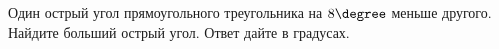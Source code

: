 \begin{ex}
	\begin{condition}
		Один острый угол прямоугольного треугольника на \( 8\degree \) меньше другого. Найдите больший острый угол. Ответ дайте в градусах.
	\end{condition}
\end{ex}